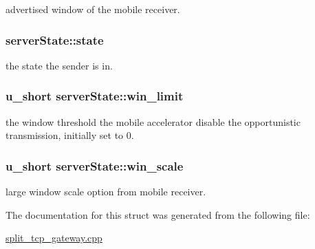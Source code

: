 advertised window of the mobile receiver. 

\hypertarget{structserverState_afe5c7957656e822dbffe80ca3da17f42}{
\subsubsection[{state}]{ {\bf server\-State\-::state}}}\label{structserverState_afe5c7957656e822dbffe80ca3da17f42}


the state the sender is in. 

\hypertarget{structserverState_a48a2d3d9f312ba2ea9c9f71e91dcb9e7}{
\subsubsection[{win\-\_\-limit}]{\setlength{\rightskip}{0pt plus 5cm}u\-\_\-short {\bf server\-State\-::win\-\_\-limit}}}\label{structserverState_a48a2d3d9f312ba2ea9c9f71e91dcb9e7}


the window threshold the mobile accelerator disable the opportunistic transmission, initially set to 0. 

\hypertarget{structserverState_ae9f552f7d1731ec394b5d003650b046c}{
\subsubsection[{win\-\_\-scale}]{\setlength{\rightskip}{0pt plus 5cm}u\-\_\-short {\bf server\-State\-::win\-\_\-scale}}}\label{structserverState_ae9f552f7d1731ec394b5d003650b046c}


large window scale option from mobile receiver. 



\-The documentation for this struct was generated from the following file\-:\begin{DoxyCompactItemize}
\item 
\hyperlink{split__tcp__gateway_8cpp}{split\-\_\-tcp\-\_\-gateway.\-cpp}\end{DoxyCompactItemize}
